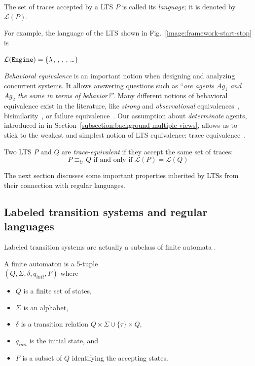 \begin{definition}
The set of traces accepted by a LTS $P$ is called its \emph{language}; it is denoted by $\mathcal{L}(P)$.
\end{definition}

For example, the language of the LTS shown in Fig.~\ref{image:framework-start-stop} is
\begin{center}
$\mathcal{L}(\texttt{Engine})=\{\lambda$, , , , \ldots $\}$
\end{center} 

\emph{Behavioral equivalence} is an important notion when designing and analyzing concurrent systems. It allows answering questions such as ``\emph{are agents $Ag_1$ and $Ag_2$ the same in terms of behavior?}''. Many different notions of behavioral equivalence exist in the literature, like \emph{strong} and \emph{observational}  equivalences~\cite{Milner:1989}, bisimilarity~\cite{Park:1981}, or failure equivalence~\cite{Hoare:1985}. Our assumption about \emph{determinate} agents, introduced in in Section~\ref{subsection:background-multiple-views}, allows us to stick to the weakest and simplest notion of LTS equivalence: trace equivalence~\cite{Hoare:1985, Engelfriet:1985}. 

\begin{definition}
Two LTS $P$ and $Q$ are \emph{trace-equivalent} if they accept the same set of traces:
\begin{equation*}
P \equiv_{tr} Q \mbox{~if and only if~} \mathcal{L}(P) = \mathcal{L}(Q)
\end{equation*}
\end{definition}

The next section discusses some important properties inherited by LTSs from their connection with regular languages. 

\subsection{Labeled transition systems and regular languages\label{section:background-lts-and-regular-languages}}

Labeled transition systems are actually a subclass of finite automata \cite{Hopcroft:1979}. 

\begin{definition}
A finite automaton is a 5-tuple \\ $(Q,\Sigma,\delta,q_{init},F)$ where 
\begin{itemize}
\item $Q$ is a finite set of states, 
\item $\Sigma$ is an alphabet, 
\item $\delta$ is a transition relation $Q \times \Sigma\cup\{\tau\} \times Q$, 
\item $q_{init}$ is the initial state, and 
\item $F$ is a subset of $Q$ identifying the accepting states. 
\end{itemize}
\end{definition}

